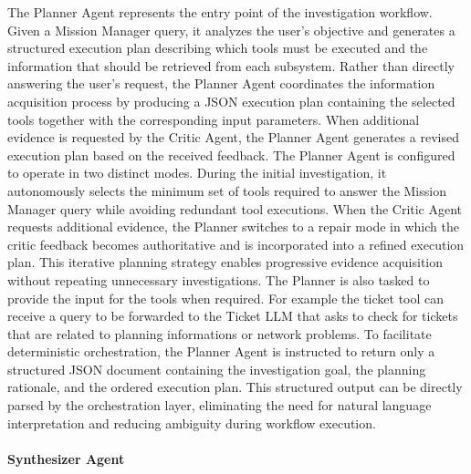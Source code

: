 The Planner Agent represents the entry point of the investigation workflow. Given a Mission Manager query, it analyzes the user's objective and generates a structured execution plan describing which tools must be executed and the information that should be retrieved from each subsystem. Rather than directly answering the user's request, the Planner Agent coordinates the information acquisition process by producing a JSON execution plan containing the selected tools together with the corresponding input parameters. When additional evidence is requested by the Critic Agent, the Planner Agent generates a revised execution plan based on the received feedback.
The Planner Agent is configured to operate in two distinct modes. During the initial investigation, it autonomously selects the minimum set of tools required to answer the Mission Manager query while avoiding redundant tool executions. When the Critic Agent requests additional evidence, the Planner switches to a repair mode in which the critic feedback becomes authoritative and is incorporated into a refined execution plan. This iterative planning strategy enables progressive evidence acquisition without repeating unnecessary investigations.
The Planner is also tasked to provide the input for the tools when required. For example the ticket tool can receive a query to be forwarded to the Ticket LLM that asks to check for tickets that are related to planning informations or network problems.
To facilitate deterministic orchestration, the Planner Agent is instructed to return only a structured JSON document containing the investigation goal, the planning rationale, and the ordered execution plan. This structured output can be directly parsed by the orchestration layer, eliminating the need for natural language interpretation and reducing ambiguity during workflow execution.

\paragraph{Synthesizer Agent}

